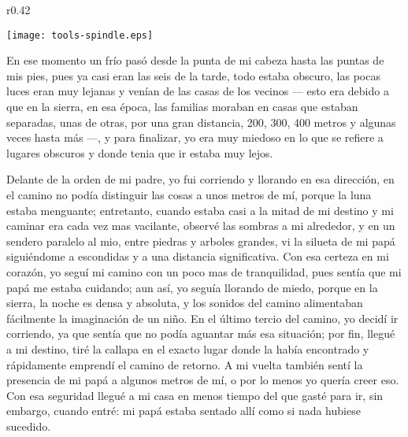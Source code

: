 \ifdefined\EnableIncludeImages
\begin{wrapfigure}{r}{0.42\textwidth}
  \begin{center}
  \vspace{-10pt}
    \texttt{[image: tools-spindle.eps]}
  \end{center}
  \vspace{-20pt}
\end{wrapfigure}
\fi
En ese momento un frío pasó desde la punta de mi cabeza hasta las puntas de mis pies, pues ya casi eran las seis de la tarde, todo estaba obscuro, las pocas luces eran muy lejanas y venían de las casas de los vecinos --- esto era debido a que en la sierra, en esa época, las familias moraban en casas que estaban separadas, unas de otras, por una gran distancia, 200, 300, 400 metros y algunas veces hasta más ---, y para finalizar, yo era muy miedoso en lo que se refiere a lugares obscuros y donde tenia que ir estaba muy lejos.

Delante de la orden de mi padre, yo fui corriendo y llorando en esa dirección, en el camino no podía distinguir las cosas a unos metros de mí, porque la luna estaba menguante; entretanto, cuando estaba casi a la mitad de mi destino y mi caminar era cada vez mas vacilante, observé las sombras a mi alrededor, y en un sendero paralelo al mio, entre piedras y arboles grandes, vi la silueta de mi papá siguiéndome a escondidas y a una distancia significativa.
Con esa certeza en mi corazón, yo seguí mi camino con un poco mas de tranquilidad, pues sentía que mi papá me estaba cuidando; aun así, yo seguía llorando de miedo, porque en la sierra, la noche es densa y absoluta, y los sonidos del camino alimentaban fácilmente la imaginación de un niño.
En el último tercio del camino, yo decidí ir corriendo, ya que sentía que no podía aguantar más esa situación; por fin, llegué a mi destino, tiré la callapa en el exacto lugar donde la había encontrado y rápidamente emprendí el camino de retorno.
A mi vuelta también sentí la presencia de mi papá a algunos metros de mí, o por lo menos yo quería creer eso. Con esa seguridad llegué a mi casa en menos tiempo del que gasté para ir, sin embargo, cuando entré: mi papá estaba sentado allí como si nada hubiese sucedido.

